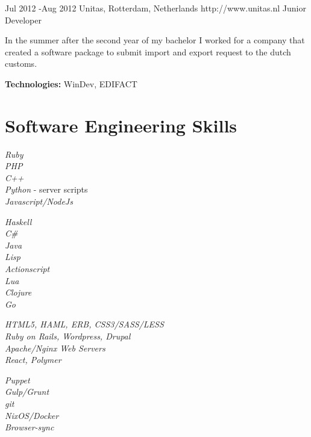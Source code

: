 \documentclass[10pt]{article} %
\begin{document}
\job
{Jul 2012 -}{Aug 2012}
{Unitas, Rotterdam, Netherlands}
{http://www.unitas.nl}
{Junior Developer}
{In the summer after the second year of my bachelor I worked for a company that created a software package to submit import and export request to the dutch customs.

\rule{0mm}{5mm}\textbf{Technologies:} WinDev, EDIFACT
}


\section{Software Engineering Skills}

{
\textit{Ruby}\\
\textit{PHP}\\
\textit{C++}\\
\textit{Python} - server scripts\\
\textit{Javascript/NodeJs}\\
}

{
  \textit{Haskell}\\
  \textit{C\#}\\
  \textit{Java}\\
  \textit{Lisp}\\
  \textit{Actionscript}\\
  \textit{Lua} \\
  \textit{Clojure}\\
  \textit{Go}\\
}


{
\textit{HTML5, HAML, ERB, CSS3/SASS/LESS}\\
\textit{Ruby on Rails, Wordpress, Drupal}\\
\textit{Apache/Nginx Web Servers}\\
\textit{React, Polymer}
}


{
\textit{Puppet}\\
\textit{Gulp/Grunt}\\
\textit{git}\\
\textit{NixOS/Docker}\\
\textit{Browser-sync}
}
\end{document}
